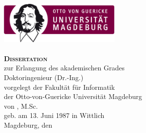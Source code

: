 \begin{titlepage}
\setlength{\parindent}{0cm}%
\begin{Large}
\begin{centering}
\includegraphics[width=6cm]{figures/OvGU-Logo.jpg}\\
\vspace*{2cm}
{\scshape\bfseries\huge \thetitle}\\
\vspace*{2\baselineskip}
{\scshape\bfseries\LARGE Dissertation}\\
\vspace*{\baselineskip}
zur Erlangung des akademischen Grades\\
\vspace*{\baselineskip}
Doktoringenieur (Dr.-Ing.)\\
\vfill
vorgelegt der Fakultät für Informatik\\
der Otto-von-Guericke Universität Magdeburg\\
\vspace*{\baselineskip}
von \theauthor, M.Sc.\\
geb. am 13. Juni 1987 in Wittlich\\
\vspace*{\baselineskip}
Magdeburg, den \thedate\\
\end{centering}
\end{Large}
\end{titlepage}